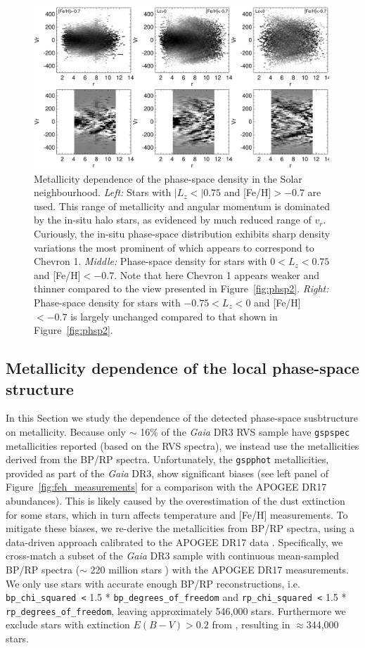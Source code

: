\documentclass[a4paper,useAMS,usenatbib]{mnras}
\begin{document}
%
\begin{figure}
  \centering
  \includegraphics[width=0.99\textwidth]{img/phase_space_feh.pdf}
  \caption[]{Metallicity dependence of the phase-space density in the Solar neighbourhood. {\it Left:} Stars with $|L_z<|0.75$ and [Fe/H]$>-0.7$ are used. This range of metallicity and angular momentum is dominated by the in-situ halo stars, as evidenced by much reduced range of $v_r$. Curiously, the in-situ phase-space distribution exhibits sharp density variations the most prominent of which appears to correspond to Chevron 1. {\it Middle:} Phase-space density for stars with $0<L_z<0.75$ and [Fe/H]$<-0.7$. Note that here Chevron 1 appears weaker and thinner compared to the view presented in Figure~\ref{fig:phsp2}. {\it Right:} Phase-space density for stars with $-0.75<L_z<0$ and [Fe/H]$<-0.7$ is largely unchanged compared to that shown in Figure~\ref{fig:phsp2}.}
   \label{fig:phsp_feh}
\end{figure}
%

\subsection{Metallicity dependence of the local phase-space structure}
\label{sec:met}

In this Section we study the dependence of the detected phase-space susbtructure on metallicity. Because only $\sim$ 16\%  of the {\it Gaia} DR3 RVS sample have {\tt gspspec} metallicities reported (based on the RVS spectra), we instead use the metallicities derived from the BP/RP spectra. Unfortunately, the {\tt gspphot} metallicities, provided as part of the {\it Gaia} DR3, show significant biases (see left panel of Figure~\ref{fig:feh_measurements} for a comparison with the APOGEE DR17 abundances). This is likely caused by the overestimation of the dust extinction for some stars, which in turn affects temperature and [Fe/H] measurements. To mitigate these biases, we re-derive the metallicities from BP/RP spectra, using a data-driven approach calibrated to the APOGEE DR17 data \citep{apogee_dr17}. Specifically, we cross-match a subset of the {\it Gaia} DR3 sample with continuous mean-sampled BP/RP spectra ($\sim$ 220 million stars ) with the APOGEE DR17 measurements. We only use stars with accurate enough BP/RP reconstructions, i.e. {\tt bp\_chi\_squared <} 1.5 * {\tt bp\_degrees\_of\_freedom} and {\tt rp\_chi\_squared <} 1.5 * {\tt rp\_degrees\_of\_freedom}, leaving approximately 546,000 stars. Furthermore we exclude stars with extinction $E(B-V)>0.2$ from \citet{sfd98}, resulting in $\approx$344,000 stars.
\end{document}
